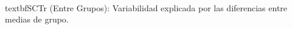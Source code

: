 \documentclass[preview]{standalone}
\begin{document}
\begin{center}
\quad\\textbf{SCTr (Entre Grupos):} Variabilidad explicada por las diferencias entre medias de grupo.
\end{center}
\end{document}
